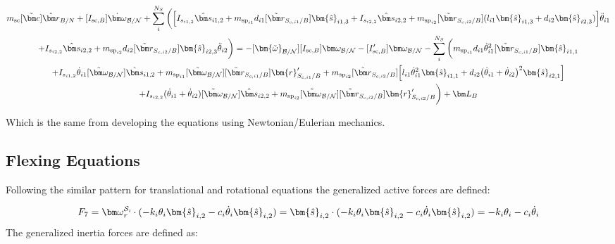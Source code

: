 \documentclass[paper]{aiaaNew}
\begin{document}
\begin{multline} 
m_{\text{sc}} [\tilde{\bm c}] \ddot{\bm r}_{B/N} +[I_{\text{sc},B}] \dot{\bm\omega}_{\cal B/N} + \sum\limits_{i}^{N_S}\bigg(\Big[I_{s_{i1,2}} \hat{\bm s}_{i1,2}+
m_{\text{sp}_{i1}} d_{i1}  [\tilde{{\bm r}}_{S_{c,i1}/B}] \bm{\hat{s}}_{i1,3} +I_{s_{i2,2}} \hat{\bm s}_{i2,2} + m_{\text{sp}_{i2}} [\tilde{{\bm r}}_{S_{c,i2}/B}] (l_{i1} \bm{\hat{s}}_{i1,3} + d_{i2} \bm{\hat{s}}_{i2,3}) \Big] \ddot{\theta}_{i1} \\
+I_{s_{i2,2}}\hat{\bm s}_{i2,2} + m_{\text{sp}_{i2}} d_{i2} [\tilde{{\bm r}}_{S_{c,i2}/B}] \bm{\hat{s}}_{i2,3} \ddot{\theta}_{i2} \bigg)=  -[\bm{\tilde{\omega}}_{\cal B/N}] [I_{\text{sc},B}] \bm\omega_{\cal B/N} - [I'_{\text{sc},B}] \bm\omega_{\cal B/N}
- \sum\limits_{i}^{N_S}\bigg(
 m_{\text{sp}_{i1}} d_{i1} \dot{\theta}_{i1}^2 [\tilde{{\bm r}}_{S_{c,i1}/B}]   \bm{\hat{s}}_{i1,1} \\ 
+I_{s_{i1,2}} \dot{\theta}_{i1} [\tilde{\bm \omega}_{\cal{B/N}}] \hat{\bm s}_{i1,2} + m_{\text{sp}_{i1}} [\tilde{\bm\omega}_{\cal B/N}] [\tilde{{\bm r}}_{S_{c,i1}/B}] \bm{r}'_{S_{c,i1}/B}
+ m_{\text{sp}_{i2}} [\tilde{{\bm r}}_{S_{c,i2}/B}] \Big[ l_{i1} \dot{\theta}_{i1}^2 \bm{\hat{s}}_{i1,1} + d_{i2}\big(\dot{\theta}_{i1} + \dot{\theta}_{i2}\big)^2\bm{\hat{s}}_{i2,1}\Big]\\ 
+I_{s_{i2,2}}  (\dot{\theta}_{i1}  + \dot{\theta}_{i2}) [\tilde{\bm \omega}_{\cal{B/N}}] \hat{\bm s}_{i2,2} + m_{\text{sp}_{i2}} [\tilde{\bm\omega}_{\cal B/N}] [\tilde{{\bm r}}_{S_{c,i2}/B}] \bm{r}'_{S_{c,i2}/B} \bigg) + \bm L_B
\end{multline}

Which is the same from developing the equations using Newtonian/Eulerian mechanics.

\subsection{Flexing Equations}
Following the similar pattern for translational and rotational equations the generalized active forces are defined:

\begin{equation}
F_{7} = \bm \omega_{\textit{r}}^{\cal{S}_\textit{i}} \cdot (-k_i \theta_i \bm{\hat{s}}_{i,2} - c_i \dot{\theta}_i \bm{\hat{s}}_{i,2}) = \bm{\hat{s}}_{i,2} \cdot (-k_i \theta_i \bm{\hat{s}}_{i,2} - c_i \dot{\theta}_i \bm{\hat{s}}_{i,2}) = -k_i \theta_i - c_i \dot{\theta}_i
\end{equation}
The generalized inertia forces are defined as: 
\end{document}
